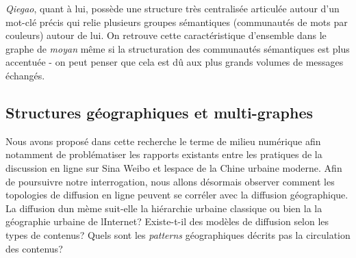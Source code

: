 \begin{figure}
    \centering
    
  \caption{
  }
\end{figure}


\textit{Qiegao}, quant \`a lui, poss\`ede une structure tr\`es
centralis\'ee articul\'ee autour d{\textquoteright}un mot-cl\'e
pr\'ecis qui relie plusieurs groupes s\'emantiques (communaut\'es de
mots par couleurs) autour de lui. On retrouve cette caract\'eristique
d{\textquoteright}ensemble dans le graphe de \textit{moyan }m\^eme si
la structuration des communaut\'es s\'emantiques est plus accentu\'ee -
on peut penser que cela est d\^u aux plus grands volumes de messages
\'echang\'es.

\subsection[Structures g\'eographiques et multi{}-graphes]{Structures g\'eographiques et multi-graphes}
Nous avons propos\'e dans cette recherche le terme de milieu num\'erique
afin notamment de probl\'ematiser les rapports existants entre les
pratiques de la discussion en ligne sur Sina Weibo et
l{\textquotesingle}espace de la Chine urbaine moderne. Afin de
poursuivre notre interrogation, nous allons d\'esormais observer
comment les topologies de diffusion en ligne peuvent se corr\'eler avec
la diffusion g\'eographique. La diffusion d{\textquotesingle}un m\`eme
suit-elle la hi\'erarchie urbaine classique ou bien la la g\'eographie
urbaine de l{\textquotesingle}Internet? Existe-t-il des mod\`eles de
diffusion selon les types de contenus? Quels sont les \textit{patterns
}g\'eographiques d\'ecrits pas la circulation des contenus?


